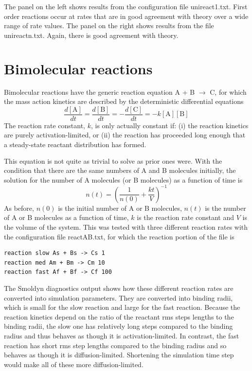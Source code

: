 \documentclass {scrbook}
\begin{document}
The panel on the left shows results from the configuration file unireact1.txt. First order reactions occur at rates that are in good agreement with theory over a wide range of rate values. The panel on the right shows results from the file unireactn.txt. Again, there is good agreement with theory.

\section{Bimolecular reactions}

Bimolecular reactions have the generic reaction equation A + B $\rightarrow$ C, for which the mass action kinetics are described by the deterministic differential equations
$$\frac{d[\textrm{A}]}{dt} = \frac{d[\textrm{B}]}{dt} = -\frac{d[\textrm{C}]}{dt} = -k [\textrm{A}] [\textrm{B}]$$
The reaction rate constant, $k$, is only actually constant if: (i) the reaction kinetics are purely activation-limited, or (ii) the reaction has proceeded long enough that a steady-state reactant distribution has formed.

This equation is not quite as trivial to solve as prior ones were. With the condition that there are the same numbers of A and B molecules initially, the solution for the number of A molecules (or B molecules) as a function of time is
$$n(t) = \left(\frac{1}{n(0)} + \frac{kt}{V} \right)^{-1}$$
As before, $n(0)$ is the initial number of A or B molecules, $n(t)$ is the number of A or B molecules as a function of time, $k$ is the reaction rate constant and $V$ is the volume of the system. This was tested with three different reaction rates with the configuration file reactAB.txt, for which the reaction portion of the file is

\begin{lstlisting}[style=SSAC]
reaction slow As + Bs -> Cs 1
reaction med Am + Bm -> Cm 10
reaction fast Af + Bf -> Cf 100
\end{lstlisting}
The Smoldyn diagnostics output shows how these different reaction rates are converted into simulation parameters. They are converted into binding radii, which is small for the slow reaction and large for the fast reaction. Because the reaction kinetics depend on the ratio of the reactant rms steps lengths to the binding radii, the slow one has relatively long steps compared to the binding radius and thus behaves as though it is activation-limited. In contrast, the fast reaction has short rms step lengths compared to the binding radius and so behaves as though it is diffusion-limited. Shortening the simulation time step would make all of these more diffusion-limited.
\end{document}
